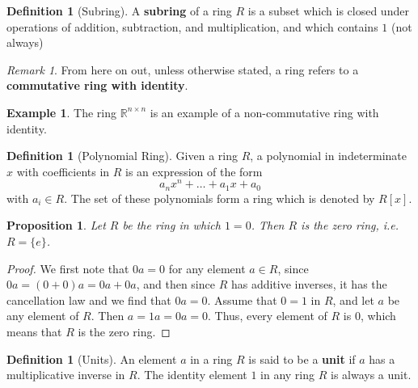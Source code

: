 \documentclass[12pt]{article}
\newtheorem{prop}[thm]{Proposition}
\theoremstyle{definition}
\newtheorem{defn}[thm]{Definition}
\newtheorem{eg}[thm]{Example}
\theoremstyle{remark}
\newtheorem{rmk}[thm]{Remark}
\numberwithin{equation}{section}
\newcommand\R{\mathbb R}    %
\newcommand\B[1]{\textbf{ #1}}
\begin{document}
\vspace{15pt}


\begin{defn}[Subring]
        A \B{subring} of a ring $R$ is a subset which is closed under operations of addition, subtraction, and multiplication, and which contains $1$ (not always)
\end{defn}


\vspace{15pt}

\begin{rmk}
        From here on out, unless otherwise stated, a ring refers to a \B{commutative ring with identity}.
\end{rmk}

\vspace{15pt}

\begin{eg}
        The ring $\R^{n\times n}$ is an example of a non-commutative ring with identity.
\end{eg}


\vspace{15pt}

\begin{defn}[Polynomial Ring]
        Given a ring $R$, a polynomial in indeterminate $x$ with coefficients in $R$ is an expression of the form \begin{equation}
                a_nx^n + \hdots + a_1x + a_0
        \end{equation}
        with $a_i \in R$. The set of these polynomials form a ring which is denoted by $R[x]$.
\end{defn}


\vspace{15pt}


\begin{prop}
        Let $R$ be the ring in which $1 = 0$. Then $R$ is the zero ring, i.e. $R = \{e\}$.
\end{prop}
\begin{proof}
        We first note that $0a = 0$ for any element $a \in R$, since $0a = (0+0)a = 0a+0a$, and then since $R$ has additive inverses, it has the cancellation law and we find that $0a = 0$. Assume that $0 = 1$ in $R$, and let $a$ be any element of $R$. Then $a = 1a = 0a = 0$. Thus, every element of $R$ is $0$, which means that $R$ is the zero ring.
\end{proof}

\vspace{15pt}

\begin{defn}[Units]
        An element $a$ in a ring $R$ is said to be a \B{unit} if $a$ has a multiplicative inverse in $R$. The identity element $1$ in any ring $R$ is always a unit.
\end{defn}
\end{document}

